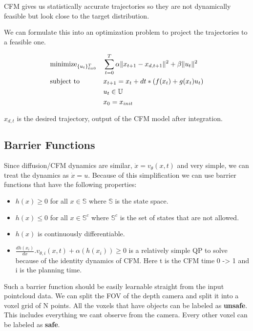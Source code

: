 \documentclass[12pt]{article}
\begin{document}
CFM gives us statistically accurate trajectories so they are not dynamically feasible but look close to the target distribution.

We can formulate this into an optimization problem to project the trajectories to a feasible one.

\[
\begin{aligned}
    &\text{minimize}_{\{u_t\}_{t=0}^T} &&  \sum_{t=0}^{T} \alpha \|x_{t+1} - x_{d,t+1}\|^2 + \beta \|u_t\|^2 \notag \\
    &\text{subject to} && x_{t+1} = x_{t} + dt * (f(x_{t}) + g(x_{t})u_{t}) \notag \\
    &&& u_{t} \in \mathbb{U} \notag \\
    &&& x_0 = x_{init} \notag \\
\end{aligned}
\]

\(x_{d,t}\) is the desired trajectory, output of the CFM model after integration.

\subsection{Barrier Functions}
Since diffusion/CFM dynamics are similar, \(\dot{x} = v_{\theta}(x,t)\) and very simple, we can treat the dynamics as \(\dot{x} = u\). Because of this simplification we can use barrier functions that have the following properties:
\begin{itemize}
    \item \(h(x) \geq 0\) for all \(x \in \mathbb{S}\) where \(\mathbb{S}\) is the state space.
    \item \(h(x) \leq 0\) for all \(x \in \mathbb{S}^c\) where \(\mathbb{S}^c\) is the set of states that are not allowed.
    \item \(h(x)\) is continuously differentiable. 
    \item \(\frac{dh(x_{i})}{dx}.v_{\theta,i}(x,t) + \alpha(h(x_{i})) \geq 0\) is a relatively simple QP to solve because of the identity dynamics of CFM. Here t is the CFM time 0 -> 1 and i is the planning time.
\end{itemize}

Such a barrier function should be easily learnable straight from the input pointcloud data. We can split the FOV of the depth camera and split it into a voxel grid of N points. All the voxels that have objects can be labeled as \textbf{unsafe}. This includes everything we cant observe from the camera. 
Every other voxel can be labeled as \textbf{safe}.
\end{document}
